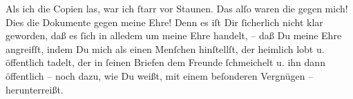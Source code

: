 \pstart
           Als ich die Copien las, war ich ſtarr vor Staunen. Das alſo waren {\pb}die \label{K_L03475-2v}\label{K_L03475-2h} gegen mich! Dies die Dokumente gegen meine Ehre! Denn es iſt Dir ſicherlich
               nicht klar geworden, daß es ſich in alledem um meine Ehre handelt, – daß Du meine
               Ehre angreifſt, indem Du mich als einen Menſchen hinſtellſt, der heimlich lobt u.
               öffentlich tadelt, der in ſeinen Briefen dem Freunde ſchmeichelt u. ihn dann
               öffentlich – noch dazu, wie Du weißt, mit einem beſonderen Vergnügen –
               herunterreißt.\pend
           
